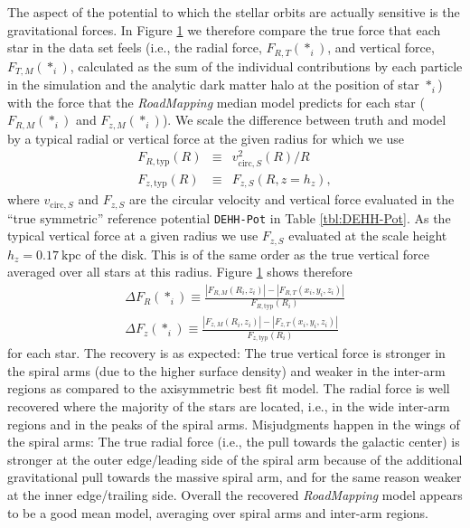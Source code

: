 \documentclass[iop,revtex4,numberedappendix,appendixfloats]{emulateapj}
\newcommand{\RM}{{\sl RoadMapping}}
\begin{document}
\begin{figure}[!htbp]
\label{fig:4kpc8Spiral_forces}
\end{figure}


The aspect of the potential to which the stellar orbits are actually sensitive is the gravitational forces. In Figure \ref{fig:4kpc8Spiral_forces} we therefore compare the true force that each star in the data set feels (i.e., the radial force, $F_{R,T}(*_i)$, and vertical force, $F_{T,M}(*_i)$, calculated as the sum of the individual contributions by each particle in the simulation and the analytic dark matter halo at the position of star $*_i$) with the force that the \RM{} median model predicts for each star ($F_{R,M}(*_i)$ and $F_{z,M}(*_i)$). We scale the difference between truth and model by a typical radial or vertical force at the given radius for which we use
\begin{eqnarray}
F_{R,\text{typ}}(R) &\equiv& v^2_{\text{circ},S}(R) / R\\
F_{z,\text{typ}}(R) &\equiv& F_{z,S}(R,z=h_z),
\end{eqnarray}
where $v_{\text{circ},S}$ and $F_{z,S}$ are the circular velocity and vertical force evaluated in the ``true symmetric'' reference potential \texttt{DEHH-Pot} in Table \ref{tbl:DEHH-Pot}. As the typical vertical force at a given radius we use $F_{z,S}$ evaluated at the scale height $h_z=0.17~\text{kpc}$ of the disk. This is of the same order as the true vertical force averaged over all stars at this radius. Figure \ref{fig:4kpc8Spiral_forces} shows therefore
\begin{eqnarray}
\Delta F_R(*_i) \equiv \frac{|F_{R,M}(R_i,z_i)| - |F_{R,T}(x_i,y_i,z_i)|}{F_{R,\text{typ}}(R_i)}\label{eq:delta_FR}\\
\Delta F_z(*_i) \equiv \frac{|F_{z,M}(R_i,z_i)| - |F_{z,T}(x_i,y_i,z_i)|}{F_{z,\text{typ}}(R_i)}\label{eq:delta_Fz}
\end{eqnarray}
for each star. The recovery is as expected: The true vertical force is stronger in the spiral arms (due to the higher surface density) and weaker in the inter-arm regions as compared to the axisymmetric best fit model. The radial force is well recovered where the majority of the stars are located, i.e., in the wide inter-arm regions and in the peaks of the spiral arms. Misjudgments happen in the wings of the spiral arms: The true radial force (i.e., the pull towards the galactic center) is stronger at the outer edge/leading side of the spiral arm because of the additional gravitational pull towards the massive spiral arm, and for the same reason weaker at the inner edge/trailing side. Overall the recovered \RM{} model appears to be a good mean model, averaging over spiral arms and inter-arm regions.
\end{document}

